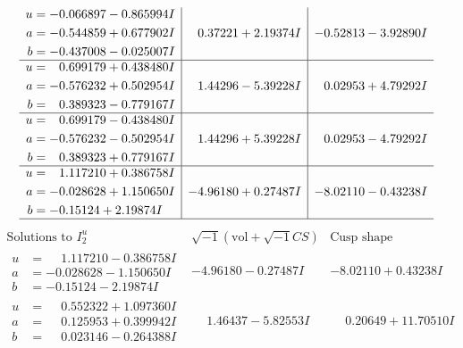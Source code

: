 \documentclass[1p]{elsarticle_modified}
\theoremstyle{definition}
\newcommand{\I}{\sqrt{-1}}
\begin{document}
$$\begin{array}{c|c|c}
\begin{aligned}
u &= -0.066897 - 0.865994 I \\
a &= -0.544859 + 0.677902 I \\
b &= -0.437008 - 0.025007 I\end{aligned}
 & \phantom{-}0.37221 + 2.19374 I & -0.52813 - 3.92890 I \\ \hline\begin{aligned}
u &= \phantom{-}0.699179 + 0.438480 I \\
a &= -0.576232 + 0.502954 I \\
b &= \phantom{-}0.389323 - 0.779167 I\end{aligned}
 & \phantom{-}1.44296 - 5.39228 I & \phantom{-}0.02953 + 4.79292 I \\ \hline\begin{aligned}
u &= \phantom{-}0.699179 - 0.438480 I \\
a &= -0.576232 - 0.502954 I \\
b &= \phantom{-}0.389323 + 0.779167 I\end{aligned}
 & \phantom{-}1.44296 + 5.39228 I & \phantom{-}0.02953 - 4.79292 I \\ \hline\begin{aligned}
u &= \phantom{-}1.117210 + 0.386758 I \\
a &= -0.028628 + 1.150650 I \\
b &= -0.15124 + 2.19874 I\end{aligned}
 & -4.96180 + 0.27487 I & -8.02110 - 0.43238 I\\
 \hline 
 \end{array}$$\newpage$$\begin{array}{c|c|c}  
\text{Solutions to }I^u_{2}& \I (\text{vol} + \sqrt{-1}CS) & \text{Cusp shape}\\
 \hline 
\begin{aligned}
u &= \phantom{-}1.117210 - 0.386758 I \\
a &= -0.028628 - 1.150650 I \\
b &= -0.15124 - 2.19874 I\end{aligned}
 & -4.96180 - 0.27487 I & -8.02110 + 0.43238 I \\ \hline\begin{aligned}
u &= \phantom{-}0.552322 + 1.097360 I \\
a &= \phantom{-}0.125953 + 0.399942 I \\
b &= \phantom{-}0.023146 - 0.264388 I\end{aligned}
 & \phantom{-}1.46437 - 5.82553 I & \phantom{-}0.20649 + 11.70510 I \\ \hline\begin{aligned}

\end{aligned}
\end{array}$$
\end{document}
